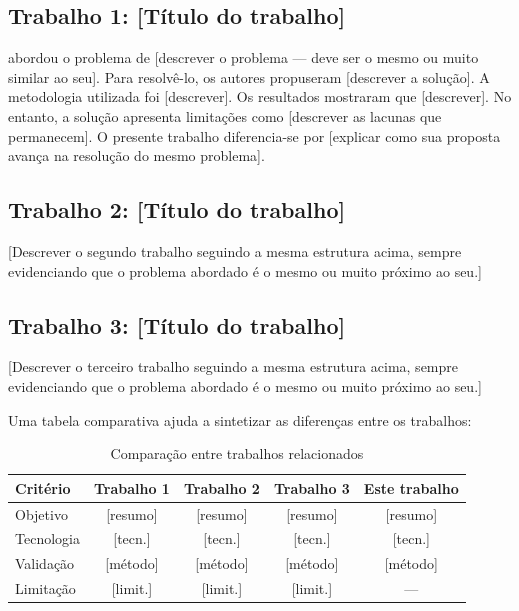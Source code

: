 \documentclass[
    12pt,                %
    openright,           %
    oneside,             %
    a4paper,             %
    english,             %
    brazil               %
]{abntex2}
\begin{document}
\subsection{Trabalho 1: [Título do trabalho]}

 abordou o problema de [descrever o problema --- deve ser o mesmo ou muito similar ao seu]. Para resolvê-lo, os autores propuseram [descrever a solução]. A metodologia utilizada foi [descrever]. Os resultados mostraram que [descrever]. No entanto, a solução apresenta limitações como [descrever as lacunas que permanecem]. O presente trabalho diferencia-se por [explicar como sua proposta avança na resolução do mesmo problema].

\subsection{Trabalho 2: [Título do trabalho]}

[Descrever o segundo trabalho seguindo a mesma estrutura acima, sempre evidenciando que o problema abordado é o mesmo ou muito próximo ao seu.]

\subsection{Trabalho 3: [Título do trabalho]}

[Descrever o terceiro trabalho seguindo a mesma estrutura acima, sempre evidenciando que o problema abordado é o mesmo ou muito próximo ao seu.]

\vspace{0.5cm}

Uma tabela comparativa ajuda a sintetizar as diferenças entre os trabalhos:

\begin{table}[htb]
    \centering
    \caption{Comparação entre trabalhos relacionados}
    \label{tab:trabalhos_relacionados}
    \begin{tabular}{l|c|c|c|c}
        \toprule
        \textbf{Critério} & \textbf{Trabalho 1} & \textbf{Trabalho 2} & \textbf{Trabalho 3} & \textbf{Este trabalho} \\
        \midrule
        Objetivo           & [resumo]   & [resumo]   & [resumo]   & [resumo] \\
        \midrule
        Tecnologia         & [tecn.]    & [tecn.]    & [tecn.]    & [tecn.] \\
        \midrule
        Validação          & [método]   & [método]   & [método]   & [método] \\
        \midrule
        Limitação          & [limit.]   & [limit.]   & [limit.]   & --- \\
        \bottomrule
    \end{tabular}
\end{table}
\end{document}
